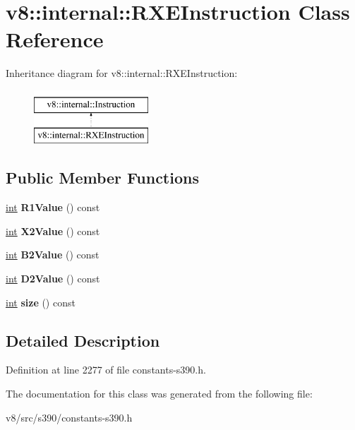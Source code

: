 \hypertarget{classv8_1_1internal_1_1RXEInstruction}{}\section{v8\+:\+:internal\+:\+:R\+X\+E\+Instruction Class Reference}
\label{classv8_1_1internal_1_1RXEInstruction}
Inheritance diagram for v8\+:\+:internal\+:\+:R\+X\+E\+Instruction\+:\begin{figure}[H]
\begin{center}
\leavevmode
\includegraphics[height=2.000000cm]{classv8_1_1internal_1_1RXEInstruction}
\end{center}
\end{figure}
\subsection*{Public Member Functions}
\begin{DoxyCompactItemize}
\item 
\mbox{\label{classv8_1_1internal_1_1RXEInstruction_a192630fb25d8770587946a1d9482fa5c}} 
\mbox{\hyperlink{classint}{int}} {\bfseries R1\+Value} () const
\item 
\mbox{\label{classv8_1_1internal_1_1RXEInstruction_a6b1487791fe609f1fdaa50c9ea1c8fa0}} 
\mbox{\hyperlink{classint}{int}} {\bfseries X2\+Value} () const
\item 
\mbox{\label{classv8_1_1internal_1_1RXEInstruction_ae43b6a8d8543d664af05d36b73ad7081}} 
\mbox{\hyperlink{classint}{int}} {\bfseries B2\+Value} () const
\item 
\mbox{\label{classv8_1_1internal_1_1RXEInstruction_a375adbe3b62b9a0b76de369320082d79}} 
\mbox{\hyperlink{classint}{int}} {\bfseries D2\+Value} () const
\item 
\mbox{\label{classv8_1_1internal_1_1RXEInstruction_adf3e8bbdbfa0893bbcd534eb03d24be9}} 
\mbox{\hyperlink{classint}{int}} {\bfseries size} () const
\end{DoxyCompactItemize}


\subsection{Detailed Description}


Definition at line 2277 of file constants-\/s390.\+h.



The documentation for this class was generated from the following file\+:\begin{DoxyCompactItemize}
\item 
v8/src/s390/constants-\/s390.\+h\end{DoxyCompactItemize}
